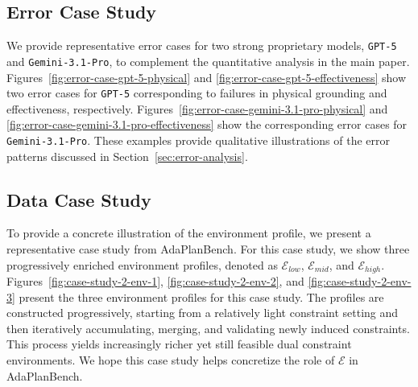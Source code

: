 \documentclass{llmxive}
\providecommand{\bench}[1]{AdaPlanBench}
\begin{document}
\subsection{Error Case Study}
\label{app:error-example}

We provide representative error cases for two strong proprietary models, \texttt{GPT-5} and \texttt{Gemini-3.1-Pro}, to complement the quantitative analysis in the main paper. Figures~\ref{fig:error-case-gpt-5-physical} and \ref{fig:error-case-gpt-5-effectiveness} show two error cases for \texttt{GPT-5} corresponding to failures in physical grounding and effectiveness, respectively. Figures~\ref{fig:error-case-gemini-3.1-pro-physical} and \ref{fig:error-case-gemini-3.1-pro-effectiveness} show the corresponding error cases for \texttt{Gemini-3.1-Pro}.
These examples provide qualitative illustrations of the error patterns discussed in Section~\ref{sec:error-analysis}.

\subsection{Data Case Study}
\label{app:case-example}



To provide a concrete illustration of the environment profile, we present a representative case study from \bench{}.
For this case study, we show three progressively enriched environment profiles, denoted as \(\mathcal{E}_{low}\), \(\mathcal{E}_{mid}\), and \(\mathcal{E}_{high}\).
Figures~\ref{fig:case-study-2-env-1}, \ref{fig:case-study-2-env-2}, and \ref{fig:case-study-2-env-3} present the three environment profiles for this case study.
The profiles are constructed progressively, starting from a relatively light constraint setting and then iteratively accumulating, merging, and validating newly induced constraints.
This process yields increasingly richer yet still feasible dual constraint environments.
We hope this case study helps concretize the role of \(\mathcal{E}\) in \bench{}.
\end{document}

